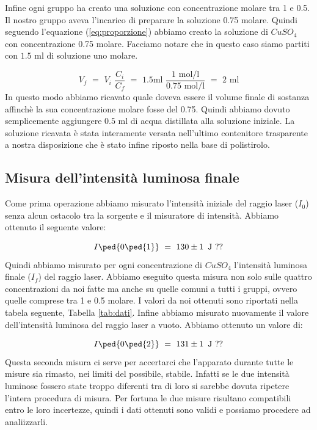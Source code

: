 Infine ogni gruppo ha creato una soluzione con concentrazione molare tra 1 e 0.5. Il nostro gruppo aveva l'incarico di preparare la soluzione 0.75 molare.
Quindi seguendo l'equazione (\ref{eq:proporzione}) abbiamo creato la soluzione di $CuSO_4$ con concentrazione 0.75 molare. Facciamo notare che in questo caso siamo partiti con $1.5\,\,\si{\milli\litre}$ di soluzione uno molare. 

\begin{equation*}
	V_f \,\, = \,\, V_i \,\, \frac{C_i}{C_f} \,\, = \,\, 1.5 \si{\milli\litre} \,\, \frac{1 \,\, \si{\mole\per\litre}}{0.75 \,\, \si{\mole\per\litre}} \,\, = \,\, 2 \,\, \si{\milli\litre}
\end{equation*}
%
In questo modo abbiamo ricavato quale doveva essere il volume finale di sostanza affinchè la sua concentrazione molare fosse del 0.75. Quindi abbiamo dovuto semplicemente aggiungere $0.5\,\,\si{\milli\litre}$ di acqua distillata alla soluzione iniziale.
La soluzione ricavata è stata interamente versata nell'ultimo contenitore trasparente a nostra disposizione che è stato infine riposto nella base di polistirolo.

\subsection{Misura dell'intensità luminosa finale}

Come prima operazione abbiamo misurato l'intensità iniziale del raggio laser ($I_0$) senza alcun ostacolo tra la sorgente e il misuratore di intensità. Abbiamo ottenuto il seguente valore:

\begin{equation*}
	I\ped{0\ped{1}} \,\,=\,\, 130 \pm 1 \,\,\, \si{\joule} \,\, ??
\end{equation*}
%
Quindi abbiamo misurato per ogni concentrazione di $CuSO_4$ l'intensità luminosa finale ($I_f$) del raggio laser. Abbiamo eseguito questa misura non solo sulle quattro concentrazioni da noi fatte ma anche su quelle comuni a tutti i gruppi, ovvero quelle comprese tra 1 e 0.5 molare. I valori da noi ottenuti sono riportati nella tabela seguente, Tabella \ref{tab:dati}.
Infine abbiamo misurato nuovamente il valore dell'intensità luminosa del raggio laser a vuoto. Abbiamo ottenuto un valore di:

\begin{equation*}
	I\ped{0\ped{2}} \,\,=\,\, 131 \pm 1 \,\,\, \si{\joule} \,\, ??
\end{equation*}
%
Questa seconda misura ci serve per accertarci che l'apparato durante tutte le misure sia rimasto, nei limiti del possibile, stabile. Infatti se le due intensità luminose fossero state troppo diferenti tra di loro si sarebbe dovuta ripetere l'intera procedura di misura. Per fortuna le due misure risultano compatibili entro le loro incertezze, quindi i dati ottenuti sono validi e possiamo procedere ad analiizzarli.

